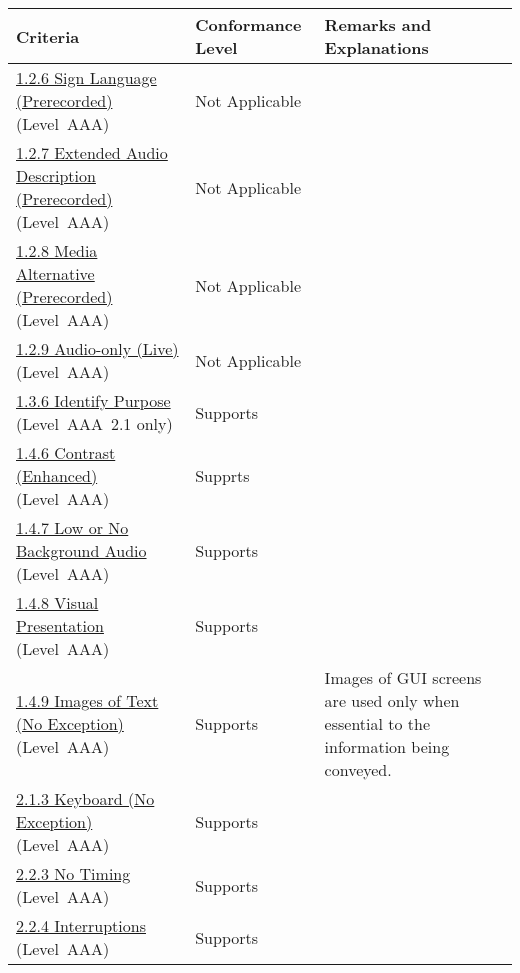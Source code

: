 \documentclass{report}
\begin{document}
\begin{longtable}{p{}<{\RaggedRight}p{}<{\RaggedRight}p{}<{\RaggedRight}}
  \toprule
  Criteria & Conformance Level & Remarks and Explanations \\
  \midrule
  \endhead
  \bottomrule
  \endfoot
  \href{http://www.w3.org/TR/WCAG20/#media-equiv-sign}{1.2.6 Sign
  Language (Prerecorded)} (Level~AAA) & Not Applicable\\
  \href{http://www.w3.org/TR/WCAG20/#media-equiv-extended-ad}{1.2.7
  Extended Audio Description (Prerecorded)} (Level~AAA) & Not
                                                          Applicable\\
  \href{http://www.w3.org/TR/WCAG20/#media-equiv-text-doc}{1.2.8 Media
  Alternative (Prerecorded)} (Level~AAA) & Not Applicable\\
  \href{http://www.w3.org/TR/WCAG20/#media-equiv-live-audio-only}{1.2.9
  Audio-only (Live)} (Level~AAA) & Not Applicable\\
  \href{https://www.w3.org/TR/WCAG21/#identify-purpose}{1.3.6 Identify
  Purpose} (Level~AAA~2.1 only) & Supports\\
  \href{http://www.w3.org/TR/WCAG20/#visual-audio-contrast7}{1.4.6
  Contrast (Enhanced)} (Level~AAA) & Supprts\\
  \href{http://www.w3.org/TR/WCAG20/#visual-audio-contrast-noaudio}{1.4.7
  Low or No Background Audio} (Level~AAA) & Supports \\
  \href{http://www.w3.org/TR/WCAG20/#visual-audio-contrast-visual-presentation}{1.4.8
  Visual Presentation} (Level~AAA) & Supports\\
  \href{http://www.w3.org/TR/WCAG20/#visual-audio-contrast-text-images}{1.4.9
  Images of Text (No Exception)} (Level~AAA) & Supports & Images of
                                                          GUI screens are used
                                                          only when
                                                          essential to
                                                          the information being conveyed.\\
  \href{http://www.w3.org/TR/WCAG20/#keyboard-operation-all-funcs}{2.1.3
  Keyboard (No Exception)} (Level~AAA) & Supports\\
  \href{http://www.w3.org/TR/WCAG20/#time-limits-no-exceptions}{2.2.3
  No Timing} (Level~AAA) & Supports\\
  \href{http://www.w3.org/TR/WCAG20/#time-limits-postponed}{2.2.4
  Interruptions} (Level~AAA) & Supports\\

\end{longtable}
\end{document}
